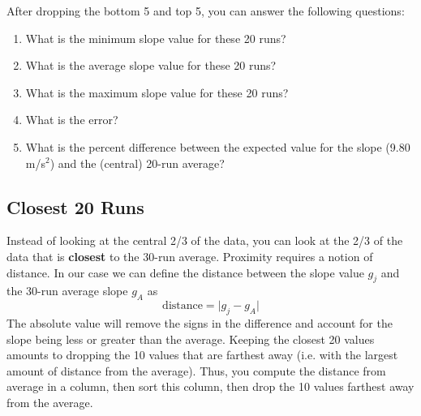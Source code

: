 After dropping the bottom 5 and top 5, you can answer the following questions:
\begin{enumerate}
    \item What is the minimum slope value for these 20 runs?
    \item What is the average slope value for these 20 runs?
    \item What is the maximum slope value for these 20 runs?
    \item What is the error?
    \item What is the percent difference between the expected value for the slope (9.80 m/s$^{2}$) and the (central) 20-run average?
\end{enumerate} 
%
\subsection{Closest 20 Runs} \label{sec:01.closest.20}
%
Instead of looking at the central 2/3 of the data, you can look at the 2/3 of the data that is \textbf{closest} to the 30-run average. Proximity requires a notion of distance. In our case we can define the distance between the slope value $g_{j}$ and the 30-run average slope $g_{A}$ as
\begin{equation}
    \text{distance} = \vert g_{j} - g_{A} \vert
\end{equation}
The absolute value will remove the signs in the difference and account for the slope being less or greater than the average. Keeping the closest 20 values amounts to dropping the 10 values that are farthest away (i.e. with the largest amount of distance from the average). Thus, you compute the distance from average in a column, then sort this column, then drop the 10 values farthest away from the average.

